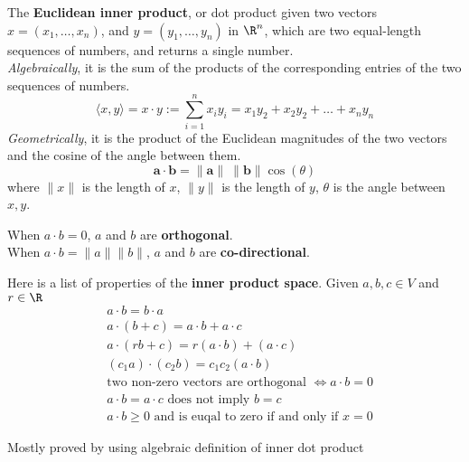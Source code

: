 \documentclass[11pt]{article}
\begin{document}
\begin{defn}
  \label{inner dot product}
  The \textbf{Euclidean inner product}, or dot product given two vectors $x = (x_1, \dots, x_n)$, and $y = (y_1, \dots, y_n)$ in $\R^n$, which are two equal-length sequences of numbers, and returns a single number. \\
  \textit{Algebraically}, it is the sum of the products of the corresponding entries of the two sequences of numbers.
  \[
    \langle x,y\rangle = x \cdot y := \sum_{i=1}^n x_i y_i = x_1y_2 + x_2y_2 + \dots + x_ny_n
  \]
  \textit{Geometrically}, it is the product of the Euclidean magnitudes of the two vectors and the cosine of the angle between them.
  \[
    \mathbf {a} \cdot \mathbf {b} =\|\mathbf {a} \|\ \|\mathbf {b} \|\cos(\theta )
  \]
  where $\|x\|$ is the length of $x$, $\|y\|$ is the length of $y$, $\theta$ is the angle between $x, y$.

  \begin{note}
    \label{orthogonality}
    $ $ \\
    When $a \cdot b =0$,  $a$ and $b$ are \textbf{orthogonal}. \\
    When $a \cdot b =\|a \| \|b \| $, $a$ and $b$ are \textbf{co-directional}. \\
  \end{note}

  \label{inner dot product space}
  Here is a list of properties of the \textbf{inner product space}. Given $a,b,c\in V$ and $r\in \R$
  \begin{align}
    &a \cdot b = b \cdot a \tag{Commutative} \\
    &a \cdot (b+c) = a\cdot b + a\cdot c \tag{Distributive over vector addition} \\
    &a\cdot (rb + c) = r(a\cdot b) + (a\cdot c) \tag{Bilinear} \\
    &(c_1a)\cdot (c_2b) = c_1 c_2 (a\cdot b) \tag{Scalar multiplication}\\
    & \text{two non-zero vectors are orthogonal } \iff a\cdot b = 0 \tag{Orthogonality} \\
    & a\cdot b = a\cdot c \text{ does not imply } b = c  \tag{No cancellation} \\
    & a\cdot b \geq 0 \text{ and is euqal to zero if and only if } x=0 \tag{Non-negative}
  \end{align}

  \begin{rem}
    Mostly proved by using algebraic definition of inner dot product
  \end{rem}
\end{defn}
\end{document}
